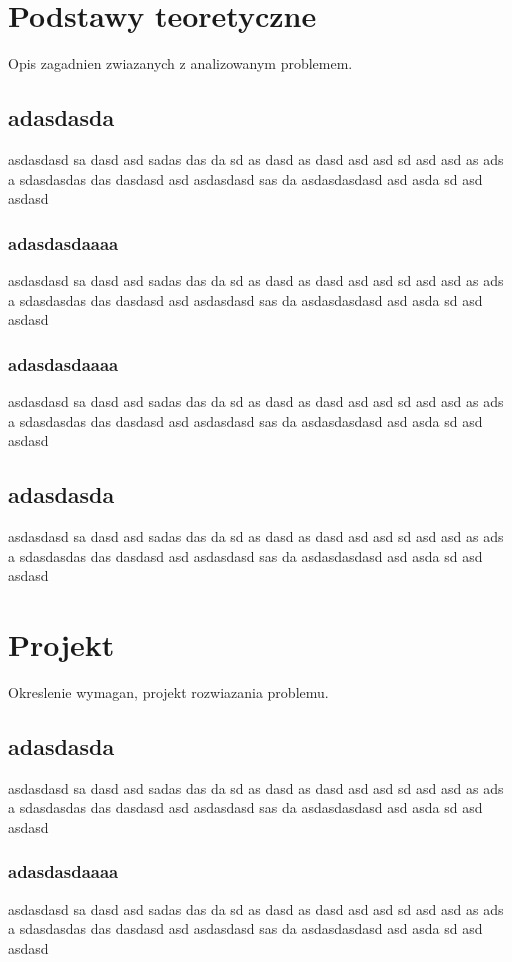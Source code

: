 \documentclass[14pt]{article}
\begin{document}
\section{Podstawy teoretyczne}
Opis zagadnien zwiazanych z analizowanym problemem.

\subsection{adasdasda}
asdasdasd sa dasd asd sadas das da sd as dasd as dasd asd asd sd asd asd as ads a sdasdasdas das dasdasd asd asdasdasd sas da asdasdasdasd asd asda sd asd asdasd

\subsubsection{adasdasdaaaa}
asdasdasd sa dasd asd sadas das da sd as dasd as dasd asd asd sd asd asd as ads a sdasdasdas das dasdasd asd asdasdasd sas da asdasdasdasd asd asda sd asd asdasd

\subsubsection{adasdasdaaaa}
asdasdasd sa dasd asd sadas das da sd as dasd as dasd asd asd sd asd asd as ads a sdasdasdas das dasdasd asd asdasdasd sas da asdasdasdasd asd asda sd asd asdasd

\subsection{adasdasda}
asdasdasd sa dasd asd sadas das da sd as dasd as dasd asd asd sd asd asd as ads a sdasdasdas das dasdasd asd asdasdasd sas da asdasdasdasd asd asda sd asd asdasd

\section{Projekt}
 Okreslenie wymagan, projekt rozwiazania problemu.
 
 \subsection{adasdasda}
asdasdasd sa dasd asd sadas das da sd as dasd as dasd asd asd sd asd asd as ads a sdasdasdas das dasdasd asd asdasdasd sas da asdasdasdasd asd asda sd asd asdasd

\subsubsection{adasdasdaaaa}
asdasdasd sa dasd asd sadas das da sd as dasd as dasd asd asd sd asd asd as ads a sdasdasdas das dasdasd asd asdasdasd sas da asdasdasdasd asd asda sd asd asdasd
\end{document}
